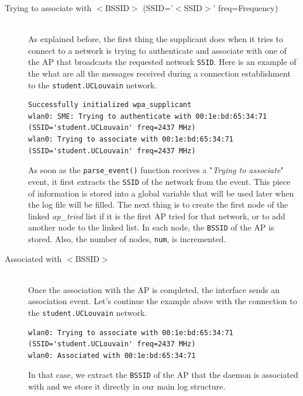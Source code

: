 \begin{description}
	\item[Trying to associate with $<$BSSID$>$ (SSID='$<$SSID$>$' freq=Frequency)]\hfill \\
		As explained before, the first thing the supplicant does when it tries to connect to a network is trying to authenticate and associate with one of the AP that broadcasts the requested network \texttt{SSID}. Here is an example of the what are all the messages received during a connection establishment to the \texttt{student.UCLouvain} network.\\

\begin{lstlisting}[frame=single,breaklines=true,caption={Example of a trying to authenticate and associate with an AP}]
Successfully initialized wpa_supplicant
wlan0: SME: Trying to authenticate with 00:1e:bd:65:34:71 (SSID='student.UCLouvain' freq=2437 MHz)
wlan0: Trying to associate with 00:1e:bd:65:34:71 (SSID='student.UCLouvain' freq=2437 MHz)
\end{lstlisting}

	As soon as the \texttt{parse\_event()} function receives a "\textit{Trying to associate}" event, it first extracts the \texttt{SSID} of the network from the event. This piece of information is stored into a global variable that will be used later when the log file will be filled. The next thing is to create the first node of the linked \textit{ap\_tried} list if it is the first AP tried for that network, or to add another node to the linked list. In each node, the \texttt{BSSID} of the AP is stored. Also, the number of nodes, \texttt{num}, is incremented.

	\item[Associated with $<$BSSID$>$]\hfill \\
	Once the association with the AP is completed, the interface sends an association event. Let's continue the example above with the connection to the \texttt{student.UCLouvain} network.\\

\begin{lstlisting}[frame=single,breaklines=true,caption={Example of a association with an AP}]
wlan0: Trying to associate with 00:1e:bd:65:34:71 (SSID='student.UCLouvain' freq=2437 MHz)
wlan0: Associated with 00:1e:bd:65:34:71
\end{lstlisting}
In that case, we extract the \texttt{BSSID} of the AP that the daemon is associated with and we store it directly in our main log structure.


\end{description}
